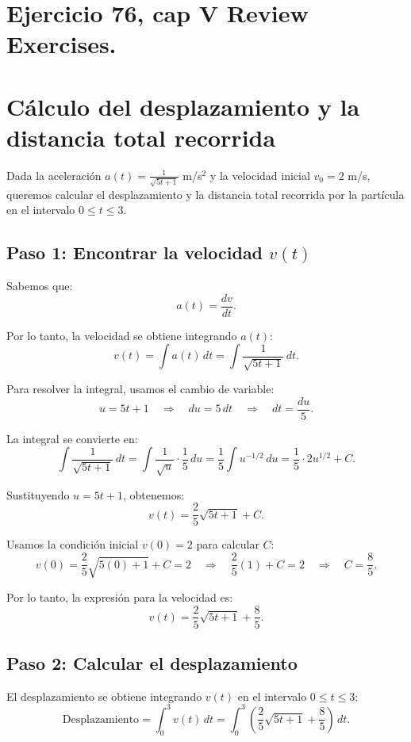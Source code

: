 \documentclass[11pt,letterpaper]{article}
\begin{document}
\section{Ejercicio 76, cap V Review Exercises.}
\section*{Cálculo del desplazamiento y la distancia total recorrida}

Dada la aceleración \(a(t) = \frac{1}{\sqrt{5t + 1}}\) m/s\(^2\) y la velocidad inicial \(v_0 = 2\) m/s, queremos calcular el desplazamiento y la distancia total recorrida por la partícula en el intervalo \(0 \leq t \leq 3\).

\subsection*{Paso 1: Encontrar la velocidad \(v(t)\)}

Sabemos que:
\[
a(t) = \frac{dv}{dt}.
\]

Por lo tanto, la velocidad se obtiene integrando \(a(t)\):
\[
v(t) = \int a(t) \, dt = \int \frac{1}{\sqrt{5t + 1}} \, dt.
\]

Para resolver la integral, usamos el cambio de variable:
\[
u = 5t + 1 \quad \Rightarrow \quad du = 5 \, dt \quad \Rightarrow \quad dt = \frac{du}{5}.
\]

La integral se convierte en:
\[
\int \frac{1}{\sqrt{5t + 1}} \, dt = \int \frac{1}{\sqrt{u}} \cdot \frac{1}{5} \, du = \frac{1}{5} \int u^{-1/2} \, du = \frac{1}{5} \cdot 2u^{1/2} + C.
\]

Sustituyendo \(u = 5t + 1\), obtenemos:
\[
v(t) = \frac{2}{5} \sqrt{5t + 1} + C.
\]

Usamos la condición inicial \(v(0) = 2\) para calcular \(C\):
\[
v(0) = \frac{2}{5} \sqrt{5(0) + 1} + C = 2 \quad \Rightarrow \quad \frac{2}{5}(1) + C = 2 \quad \Rightarrow \quad C = \frac{8}{5}.
\]

Por lo tanto, la expresión para la velocidad es:
\[
v(t) = \frac{2}{5} \sqrt{5t + 1} + \frac{8}{5}.
\]

\subsection*{Paso 2: Calcular el desplazamiento}

El desplazamiento se obtiene integrando \(v(t)\) en el intervalo \(0 \leq t \leq 3\):
\[
\text{Desplazamiento} = \int_{0}^{3} v(t) \, dt = \int_{0}^{3} \left( \frac{2}{5} \sqrt{5t + 1} + \frac{8}{5} \right) \, dt.
\]
\end{document}
